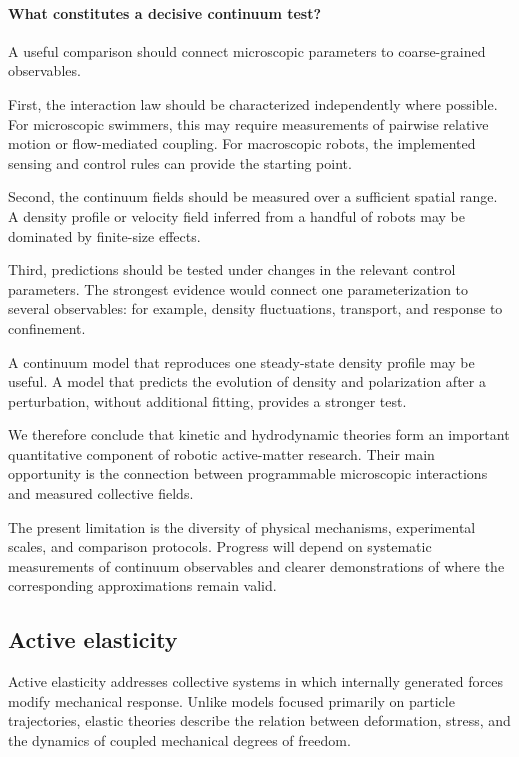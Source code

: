 \paragraph*{What constitutes a decisive continuum test?}

A useful comparison should connect
microscopic parameters to
coarse-grained observables.

First, the interaction law
should be characterized
independently where possible.
For microscopic swimmers,
this may require measurements
of pairwise relative motion
or flow-mediated coupling.
For macroscopic robots,
the implemented sensing
and control rules can
provide the starting point.

Second, the continuum fields
should be measured over
a sufficient spatial range.
A density profile or
velocity field inferred
from a handful of robots
may be dominated by
finite-size effects.

Third, predictions should
be tested under changes
in the relevant control
parameters. The strongest
evidence would connect
one parameterization
to several observables:
for example, density
fluctuations, transport,
and response to confinement.

A continuum model that
reproduces one steady-state
density profile may be
useful. A model that
predicts the evolution
of density and polarization
after a perturbation,
without additional fitting,
provides a stronger test.

We therefore conclude
that kinetic and
hydrodynamic theories
form an important
quantitative component
of robotic active-matter
research. Their main
opportunity is the
connection between
programmable microscopic
interactions and
measured collective fields.

The present limitation
is the diversity of
physical mechanisms,
experimental scales,
and comparison protocols.
Progress will depend
on systematic measurements
of continuum observables
and clearer demonstrations
of where the corresponding
approximations remain valid.

\subsection{Active elasticity}
\label{sec:theory-active-elasticity}

Active elasticity addresses collective systems in which
internally generated forces modify mechanical response.
Unlike models focused primarily on particle trajectories,
elastic theories describe the relation between deformation,
stress, and the dynamics of coupled mechanical degrees
of freedom.

